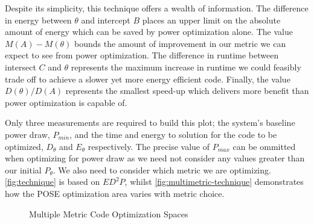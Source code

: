 Despite its simplicity, this technique offers a wealth of information. The difference in energy between $\theta$ and intercept $B$ places an upper limit on the absolute amount of energy which can be saved by power optimization alone. The value $M(A) - M(\theta)$ bounds the amount of improvement in our metric we can expect to see from power optimization. The difference in runtime between intersect $C$ and $\theta$ represents the maximum increase in runtime we could feasibly trade off to achieve a slower yet more energy efficient code. Finally, the value $D(\theta) / D(A)$ represents the smallest speed-up which delivers more benefit than power optimization is capable of.

Only three measurements are required to build this plot; the system's baseline power draw, $P_{min}$, and the time and energy to solution for the code to be optimized, $D_\theta$ and $E_\theta$ respectively.
The precise value of $P_{max}$ can be ommitted when optimizing for power draw as we need not consider any values greater than our initial $P_\theta$.
We also need to consider which metric we are optimizing. \autoref{fig:technique} is based on $ED^2P$, whilst \autoref{fig:multimetric-technique} demonstrates how the POSE optimization area varies with metric choice.

\begin{figure}
\centering

\caption{Multiple Metric Code Optimization Spaces}
\label{fig:multimetric-technique}
\end{figure}
